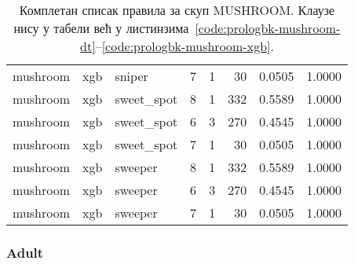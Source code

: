 \begin{appendices}
\begin{table}[H]
{\begin{tabular}{@{}lllrrrrr@{}}
mushroom & xgb & sniper      & 7 & 1 & 30  & 0.0505 & 1.0000 \\
mushroom & xgb & sweet\_spot & 8 & 1 & 332 & 0.5589 & 1.0000 \\
mushroom & xgb & sweet\_spot & 6 & 3 & 270 & 0.4545 & 1.0000 \\
mushroom & xgb & sweet\_spot & 7 & 1 & 30  & 0.0505 & 1.0000 \\
mushroom & xgb & sweeper     & 8 & 1 & 332 & 0.5589 & 1.0000 \\
mushroom & xgb & sweeper     & 6 & 3 & 270 & 0.4545 & 1.0000 \\
mushroom & xgb & sweeper     & 7 & 1 & 30  & 0.0505 & 1.0000 \\
\bottomrule
\end{tabular}%
}
\caption{Комплетан списак правила за скуп MUSHROOM. Клаузе нису у табели већ у листинзима~\ref{code:prologbk-mushroom-dt}--\ref{code:prologbk-mushroom-xgb}.}
\label{tab:rules-mushroom}
\end{table}


\subsubsection{Adult}


\end{appendices}
